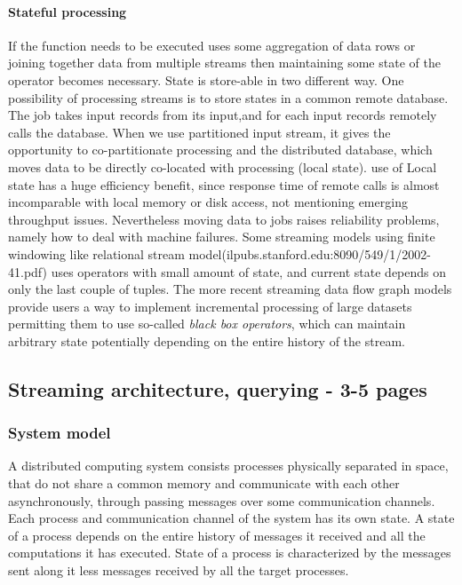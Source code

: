 \paragraph{Stateful processing}
If the function needs to be executed uses some aggregation of data rows or joining together data from multiple streams then maintaining some state of the operator becomes necessary. 
State is store-able in two different way. One possibility of processing streams is to store states in a common remote database. The job takes input records from its input,and for each input records remotely calls the database. 
When we use partitioned input stream, it gives the opportunity to co-partitionate processing and the distributed database, which moves data to be directly co-located with processing (local state).
use of Local state has a huge efficiency benefit, since response time of remote calls is almost incomparable with local memory or disk access, not mentioning emerging throughput issues.
Nevertheless moving data to jobs raises reliability problems, namely  how to deal with machine failures.\cite{localstate}
Some streaming models using finite windowing like relational stream model(ilpubs.stanford.edu:8090/549/1/2002-41.pdf) uses operators with small amount of state, and current state depends on only the last couple of tuples. The more recent streaming data flow graph models provide users a way to implement incremental processing of large datasets permitting them to use so-called \textit{black box operators}, which can maintain arbitrary state potentially depending on the entire history of the stream. \cite{pietzuch:intscaleoutandft}  


\subsection{Streaming architecture, querying -  3-5 pages}
\subsubsection{System model}
A distributed computing system consists processes physically separated in space, that do not share a common memory and communicate with each other asynchronously, through passing messages over some communication channels. Each process and communication channel of the system has its  own state. A state of a process depends on the entire history of messages it received and all the computations it has executed. State of a process is characterized by the messages sent along it less messages received by all the  target processes.
\cite{introsnapshot}
